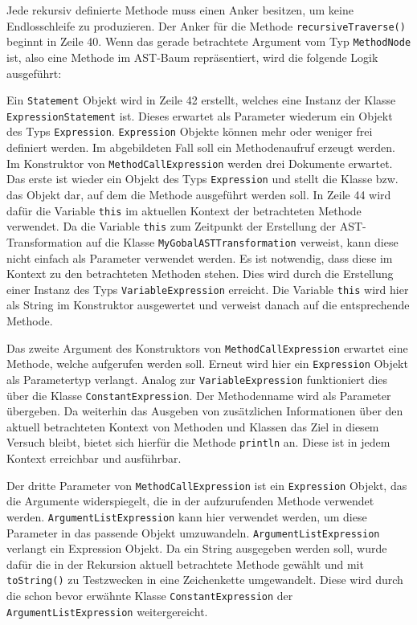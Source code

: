 Jede rekursiv definierte Methode muss einen Anker besitzen, um keine Endlosschleife zu produzieren. Der Anker für die Methode \texttt{recursiveTraverse()} beginnt in Zeile 40. Wenn das gerade betrachtete Argument vom Typ \texttt{MethodNode} ist, also eine Methode im AST-Baum repräsentiert, wird die folgende Logik ausgeführt:

Ein \texttt{Statement} Objekt wird in Zeile 42 erstellt, welches eine Instanz der Klasse \texttt{ExpressionStatement} ist. 
Dieses erwartet als Parameter wiederum ein Objekt des Typs \texttt{Expression}. 
\texttt{Expression} Objekte können mehr oder weniger frei definiert werden.
Im abgebildeten Fall soll ein Methodenaufruf erzeugt werden. 
Im Konstruktor von \texttt{MethodCallExpression} werden drei Dokumente erwartet. 
Das erste ist wieder ein Objekt des Typs \texttt{Expression} und stellt die Klasse bzw. das Objekt dar, auf dem die Methode ausgeführt werden soll. 
In Zeile 44 wird dafür die Variable \texttt{this} im aktuellen Kontext der betrachteten Methode verwendet. 
Da die Variable \texttt{this} zum Zeitpunkt der Erstellung der AST-Transformation auf die Klasse \texttt{MyGobalASTTransformation} verweist, kann diese nicht einfach als Parameter verwendet werden. 
Es ist notwendig, dass diese im Kontext zu den betrachteten Methoden stehen. 
Dies wird durch die Erstellung einer Instanz des Typs \texttt{VariableExpression} erreicht. 
Die Variable \texttt{this} wird hier als String im Konstruktor ausgewertet und verweist danach auf die entsprechende Methode. 

Das zweite Argument des Konstruktors von \texttt{MethodCallExpression} erwartet eine Methode, welche aufgerufen werden soll. 
Erneut wird hier ein \texttt{Expression} Objekt als Parametertyp verlangt. 
Analog zur \texttt{VariableExpression} funktioniert dies über die Klasse \texttt{ConstantExpression}. 
Der Methodenname wird als Parameter übergeben. Da weiterhin das Ausgeben von zusätzlichen Informationen über den aktuell betrachteten Kontext von Methoden und Klassen das Ziel in diesem Versuch bleibt, bietet sich hierfür die Methode \texttt{println} an. 
Diese ist in jedem Kontext erreichbar und ausführbar. 

Der dritte Parameter von \texttt{MethodCallExpression} ist ein \texttt{Expression} Objekt, das die Argumente widerspiegelt, die in der aufzurufenden Methode verwendet werden. \texttt{ArgumentListExpression} kann hier verwendet werden, um diese Parameter in das passende Objekt umzuwandeln. \texttt{ArgumentListExpression} verlangt ein Expression Objekt. 
Da ein String ausgegeben werden soll, wurde dafür die in der Rekursion aktuell betrachtete Methode gewählt und mit \texttt{toString()} zu Testzwecken in eine Zeichenkette umgewandelt. 
Diese wird durch die schon bevor erwähnte Klasse \texttt{ConstantExpression} der \texttt{ArgumentListExpression} weitergereicht.

